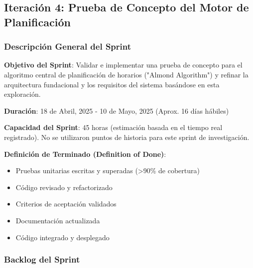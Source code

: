 
\subsection{Iteración 4: Prueba de Concepto del Motor de Planificación}

\subsubsection{Descripción General del Sprint}

\textbf{Objetivo del Sprint}: Validar e implementar una prueba de concepto para el algoritmo central de planificación de horarios ("Almond Algorithm") y refinar la arquitectura fundacional y los requisitos del sistema basándose en esta exploración.

\textbf{Duración}: 18 de Abril, 2025 - 10 de Mayo, 2025 (Aprox. 16 días hábiles)

\textbf{Capacidad del Sprint}: 45 horas (estimación basada en el tiempo real registrado). No se utilizaron puntos de historia para este sprint de investigación.

\textbf{Definición de Terminado (Definition of Done)}: 
\begin{itemize}
    \item Pruebas unitarias escritas y superadas (>90\% de cobertura)
    \item Código revisado y refactorizado
    \item Criterios de aceptación validados
    \item Documentación actualizada
    \item Código integrado y desplegado
\end{itemize}

\subsubsection{Backlog del Sprint}

